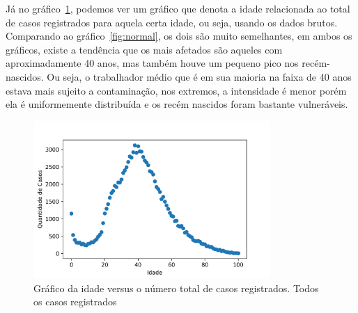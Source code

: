 Já no gráfico~\ref{fig:uc9}, podemos ver um gráfico que denota a idade relacionada ao total de casos registrados para aquela certa idade, ou seja, usando os dados brutos. Comparando ao gráfico~\ref{fig:normal}, os dois são muito semelhantes, em ambos os gráficos, existe a tendência que os mais afetados são aqueles com aproximadamente 40 anos, mas também houve um pequeno pico nos recém-nascidos. Ou seja, o trabalhador médio que é em sua maioria na faixa de 40 anos estava mais sujeito a contaminação, nos extremos, a intensidade é menor porém ela é uniformemente distribuída e os recém nascidos foram bastante vulneráveis. 
\begin{figure}[!ht]
\centering
    \includegraphics[width=9cm]{img/distribuicaoPorIdade2.7.png}
    \caption{Gráfico da idade versus o número total de casos registrados. Todos os casos registrados}
    \label{fig:uc9} %
\end{figure}